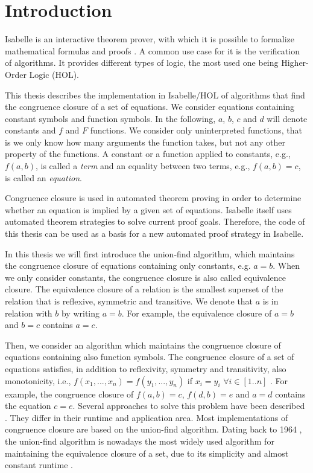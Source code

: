 
\chapter{Introduction}\label{chapter:introduction}

Isabelle is an interactive theorem prover, with which it is possible to formalize mathematical formulas and proofs \cite{isabelle}. A common use case for it is the verification of algorithms.
It provides different types of logic, the most used one being Higher-Order Logic (HOL).

This thesis describes the implementation in Isabelle/HOL of algorithms that find the congruence closure of a set of equations. We consider equations containing constant symbols and function symbols. In the following, $a$, $b$, $c$ and $d$ will denote constants and $f$ and $F$ functions.
We consider only uninterpreted functions, that is we only know how many arguments the function takes, but not any other property of the functions.
A constant or a function applied to constants, e.g., $f(a, b)$, is called a \emph{term} and an equality between two terms, e.g., $f(a, b) = c$, is called an \emph{equation}.

Congruence closure is used in automated theorem proving in order to determine whether an equation is implied by a given set of equations.
Isabelle itself uses automated theorem strategies to solve current proof goals.
Therefore, the code of this thesis can be used as a basis for a new automated proof strategy in Isabelle.

In this thesis we will first introduce the union-find algorithm, which maintains the congruence closure of equations containing only constants, e.g. $a = b$. When we only consider constants, the congruence closure is also called equivalence closure. The equivalence closure of a relation is the smallest superset of the relation that is reflexive, symmetric and transitive. We denote that $a$ is in relation with $b$ by writing $a = b$. For example, the equivalence closure of $a = b$ and $b = c$ contains $a = c$.

Then, we consider an algorithm which maintains the congruence closure of equations containing also function symbols. The congruence closure of a set of equations satisfies, in addition to reflexivity, symmetry and transitivity, also monotonicity, i.e., $f(x_1, ... ,x_n) = f(y_1, ... ,y_n)$ if $x_i = y_i$ $\forall i \in [1..n]$ \cite{Nieuwenhuis}.
For example, the congruence closure of $f(a,b) = c$, $f(d,b) = e$ and $a = d$ contains the equation $c = e$. Several approaches to solve this problem have been described \cite{congruenceclosure-og2,congruenceclosure-og,congruenceclosure-og3,Nieuwenhuis}.
They differ in their runtime and application area.
Most implementations of congruence closure are based on the union-find algorithm. Dating back to 1964 \cite{unionfind-og}, the union-find algorithm is nowadays the most widely used algorithm for maintaining the equivalence closure of a set, due to its simplicity and almost constant runtime \cite{Tarjan}.


